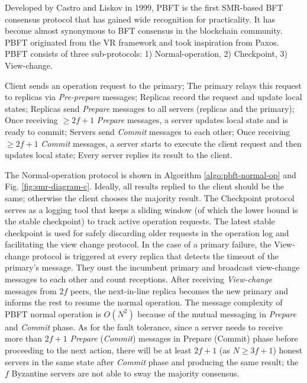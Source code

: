 Developed by Castro and Liskov  in 1999, PBFT is the first SMR-based BFT consensus protocol that has gained wide recognition for practicality. It has become almost synonymous to BFT consensus in the blockchain community. PBFT originated from the VR framework and took inspiration from Paxos. PBFT consists of three sub-protocols: 1) Normal-operation, 2) Checkpoint, 3) View-change. 
\begin{algorithm}
\label{algo:pbft-normal-op}
\caption{PBFT (Normal-operation protocol)}
\SetAlgoLined
{}
\setcounter{AlgoLine}{0}
Client sends an operation request to the primary;
The primary relays this request to replicas via \emph{Pre-prepare} messages;
Replicas record the request and update local states;
Replicas send \emph{Prepare} messages to all servers (replicas and the primary);
Once receiving $\geq2f+1$ \emph{Prepare} messages, a server updates local state and is ready to commit;
Servers send \emph{Commit} messages to each other;
Once receiving $\geq2f+1$ \emph{Commit} messages, a server starts to execute the client request and then updates local state;
Every server replies its result to the client.
\end{algorithm}
The Normal-operation protocol is shown in Algorithm \ref{algo:pbft-normal-op} and Fig. \ref{fig:smr-diagram-c}. Ideally, all results replied to the client should be the same; otherwise the client chooses the majority result. 
The Checkpoint protocol serves as a logging tool that keeps a sliding window (of which the lower bound is the stable checkpoint) to track active operation requests. The latest stable checkpoint is used for safely discarding older requests in the operation log and facilitating the view change protocol. 
In the case of a primary failure, the View-change protocol is triggered at every replica that detects the timeout of the primary's message. They oust the incumbent primary and broadcast view-change messages to each other and count receptions. After receiving \emph{View-change} messages from $2f$ peers, the next-in-line replica becomes the new primary and informs the rest to resume the normal operation.
{\color{\rcolor}
The message complexity of PBFT normal operation is $O(N^2)$ because of the mutual messaging in \textit{Prepare} and \textit{Commit} phase. As for the  fault tolerance, since a server needs to receive more than $2f+1$ \textit{Prepare} (\textit{Commit}) messages in Prepare (Commit) phase before proceeding to the next action, there will be at least $2f+1$ (as $N\geq 3f+1$) honest servers in the same state after \textit{Commit} phase and producing the same result; the $f$ Byzantine servers are not able to sway the majority consensus.
}
